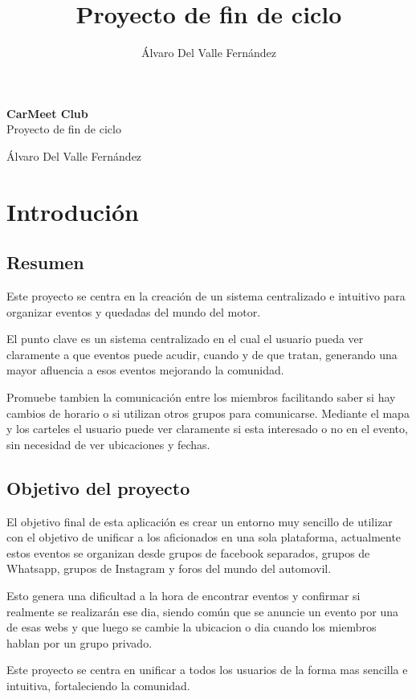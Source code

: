 \documentclass[a4paper, 11pt]{article}
\title{Proyecto de fin de ciclo}
\author{Álvaro Del Valle Fernández}
\begin{document}
\begin{center}
\vspace*{\fill}
{\Huge\textbf{CarMeet Club}} \\
\vspace{1cm}
{\LARGE Proyecto de fin de ciclo}\par
\vspace{1cm}
{Álvaro Del Valle Fernández}
\vspace*{\fill} 
\end{center}
\newpage

\tableofcontents
\clearpage


\section{Introdución}
    \subsection{Resumen}
Este proyecto se centra en la creación de un sistema centralizado e intuitivo para organizar eventos y quedadas del mundo del motor. \par
El punto clave es un sistema centralizado en el cual el usuario pueda ver claramente a que eventos puede acudir, cuando y de que tratan, 
generando una mayor afluencia a esos eventos mejorando la comunidad. \par
Promuebe tambien la comunicación entre los miembros facilitando saber si hay cambios de horario o si utilizan otros grupos para comunicarse. 
Mediante el mapa y los carteles el usuario puede ver claramente si esta interesado o no en el evento, sin necesidad de ver ubicaciones y fechas.
    \subsection{Objetivo del proyecto}
El objetivo final de esta aplicación es crear un entorno muy sencillo de utilizar con el objetivo de unificar a los aficionados en una sola plataforma,
actualmente estos eventos se organizan desde grupos de facebook separados, grupos de Whatsapp, grupos de Instagram y foros del mundo del automovil. \par 
Esto genera una dificultad a la hora de encontrar eventos y confirmar si realmente se realizarán ese dia, siendo común que se anuncie un evento por
una de esas webs y que luego se cambie la ubicacion o dia cuando los miembros hablan por un grupo privado. \par
Este proyecto se centra en unificar a todos los usuarios de la forma mas sencilla e intuitiva, fortaleciendo la comunidad.
\newpage
\end{document}
